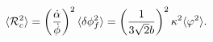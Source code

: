 \begin{equation}
\langle {\cal R}_c^2 \rangle = 
\left(\frac{\dot{\alpha}}{\dot{\phi}} \right)^2 \langle \delta \phi_f^2 \rangle
=\left(\frac{1}{3 \sqrt{2} b} \right)^2 \kappa^2  \langle \varphi^2 \rangle.
\end{equation}

